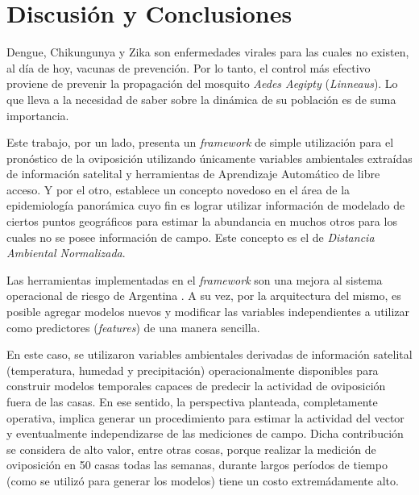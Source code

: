 %
%
%

\justifying

\chapter{Discusión y Conclusiones}

  \par Dengue, Chikungunya y Zika son enfermedades virales para las cuales no
    existen, al día de hoy, vacunas de prevención. Por lo tanto, el control
    más efectivo proviene de prevenir la propagación del mosquito
    \textit{Aedes Aegipty} (\textit{Linneaus}). Lo que lleva a la necesidad de saber sobre la
    dinámica de su población es de suma importancia.

  \par Este trabajo, por un lado, presenta un \textit{framework} de simple
    utilización para el
    pronóstico de la oviposición utilizando
    únicamente variables ambientales extraídas de información satelital y
    herramientas de Aprendizaje Automático de libre acceso. Y por el otro,
    establece un concepto novedoso en el área de la epidemiología panorámica
    cuyo fin es lograr utilizar información de modelado de ciertos puntos geográficos
    para estimar la abundancia en muchos otros para los cuales no se posee
    información de campo. Este concepto es el de \textit{Distancia Ambiental Normalizada}.

  \par Las herramientas implementadas en el \textit{framework}
    son una mejora al sistema operacional de riesgo de
    Argentina \cite{porcasi_operative}. A su vez, por la arquitectura del mismo,
    es posible agregar modelos nuevos y modificar las variables independientes a utilizar como
    predictores (\textit{features}) de una manera sencilla.

  \par En este caso, se utilizaron variables ambientales derivadas de información satelital
    (temperatura, humedad y precipitación) operacionalmente disponibles para
    construir modelos temporales capaces de predecir la actividad de oviposición
    fuera de las casas. En ese sentido, la perspectiva planteada, completamente operativa,
    implica generar un procedimiento para estimar la actividad del vector
    y eventualmente independizarse de las mediciones de campo. Dicha contribución
    se considera de alto valor, entre otras cosas, porque realizar la medición
    de oviposición en 50 casas todas las semanas, durante
    largos períodos de tiempo (como se utilizó para generar los modelos) tiene
    un costo extremádamente alto.

